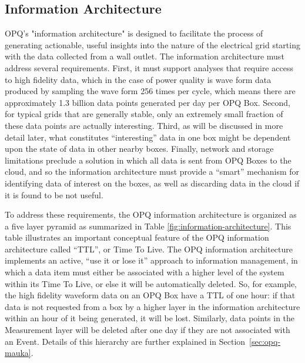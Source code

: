 \subsection{Information Architecture}

OPQ's "information architecture" is designed to facilitate the process of generating actionable, useful insights into the nature of the electrical grid starting with the data collected from a wall outlet. The information architecture must address several requirements. First, it must support analyses that require access to high fidelity data, which in the case of power quality is wave form data produced by sampling the wave form 256 times per cycle, which means there are approximately 1.3 billion data points generated per day per OPQ Box. Second, for typical grids that are generally stable, only an extremely small fraction of these data points are actually interesting. Third, as will be discussed in more detail later, what constitutes ``interesting'' data in one box might be dependent upon the state of data in other nearby boxes. Finally, network and storage limitations preclude a solution in which all data is sent from OPQ Boxes to the cloud, and so the information architecture must provide a ``smart'' mechanism for identifying data of interest on the boxes, as well as discarding data in the cloud if it is found to be not useful.

To address these requirements, the OPQ information architecture is organized as a five layer pyramid as summarized in Table \ref{fig:information-architecture}. This table illustrates an important conceptual feature of the OPQ information architecture called ``TTL'', or Time To Live. The OPQ information architecture implements an active, ``use it or lose it'' approach to information management, in which a data item must either be associated with a higher level of the system within its Time To Live, or else it will be automatically deleted. So, for example, the high fidelity waveform data on an OPQ Box have a TTL of one hour: if that data is not requested from a box by a higher layer in the information architecture within an hour of it being generated, it will be lost. Similarly, data points in the Measurement layer will be deleted after one day if they are not associated with an Event. Details of this hierarchy are further explained in Section~\ref{sec:opq-mauka}.

